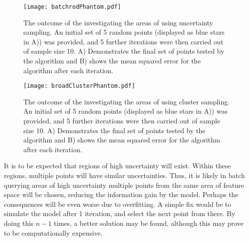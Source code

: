 \begin{figure}[H]
    \begin{center}
        \texttt{[image: batchrodPhantom.pdf]}
        \caption[Batch Uncertainty Sampling]{The outcome of the investigating the areas of using uncertainty sampling. An initial set of 5 random points (displayed as blue stars in A)) was provided, and 5 further iterations were then carried out of sample size 10. A) Demonstrates the final set of points tested by the algorithm and B) shows the mean squared error for the algorithm after each iteration.}
        \label{fig:broadrod}
    \end{center}
\end{figure}


\begin{figure}[H]
    \begin{center}
        \texttt{[image: broadClusterPhantom.pdf]}
        \caption[Batch Cluster Sampling]{The outcome of the investigating the areas of using cluster sampling. An initial set of 5 random points (displayed as blue stars in A)) was provided, and 5 further iterations were then carried out of sample size 10. A) Demonstrates the final set of points tested by the algorithm and B) shows the mean squared error for the algorithm after each iteration.}
        \label{fig:batchCluster}
    \end{center}
\end{figure}


It is to be expected that regions of high uncertainty will exist. Within these regions, multiple points will have similar uncertainties. Thus, it is likely in batch querying areas of high uncertainty multiple points from the same area of feature space will be chosen, reducing the information gain by the model. Perhaps the consequences will be even worse due to overfitting. A simple fix would be to simulate the model after 1 iteration, and select the next point from there. By doing this $n-1$ times, a better solution may be found, although this may prove to be computationally expensive.

